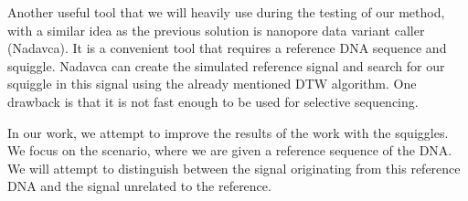 Another useful tool that we will heavily use during the testing of our method, with a similar idea as the previous solution is
nanopore data variant caller (Nadavca). It is a convenient tool that requires a reference
DNA sequence and squiggle. Nadavca can create the simulated reference signal
and search for our squiggle in this signal using the already mentioned DTW algorithm.
One drawback is that it is not fast enough to be used for selective sequencing.

In our work, we attempt to improve the results of the work with the squiggles.
We focus on the scenario, where we are given a reference sequence of the DNA. We
will attempt to distinguish between the signal originating from this reference DNA and the
signal unrelated to the reference.
